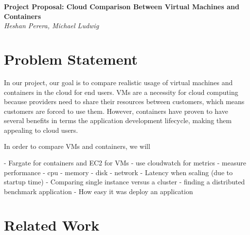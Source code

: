 \documentclass[11pt]{article}
\begin{document}
\renewcommand{\headrulewidth}{0pt} 
\renewcommand{\footrulewidth}{0pt} 
\pagestyle{fancy}
\cfoot{}
\lhead{}
\rhead{}
\lfoot{\itshape\textcolor{gray}{CS525T Cloud Computing Paper Review}}

\begin{center}
{\LARGE \bf Project Proposal: Cloud Comparison Between Virtual Machines and Containers} \\
{\normalsize \emph{Heshan Perera, Michael Ludwig}}\\

\end{center}

\section{Problem Statement}

In our project, our goal is to compare realistic usage of virtual machines and containers in the cloud for end users. VMs are a necessity for cloud computing because providers need to share their resources between customers, which means customers are forced to use them. However, containers have proven to have several benefits in terms the application development lifecycle, making them appealing to cloud users.

In order to compare VMs and containers, we will 

- Fargate for containers and EC2 for VMs
- use cloudwatch for metrics
- measure performance
  - cpu
  - memory
  - disk
  - network
- Latency when scaling (due to startup time)
- Comparing single instance versus a cluster
  - finding a distributed benchmark application
- How easy it was deploy an application

\section{Related Work}

\end{document}
